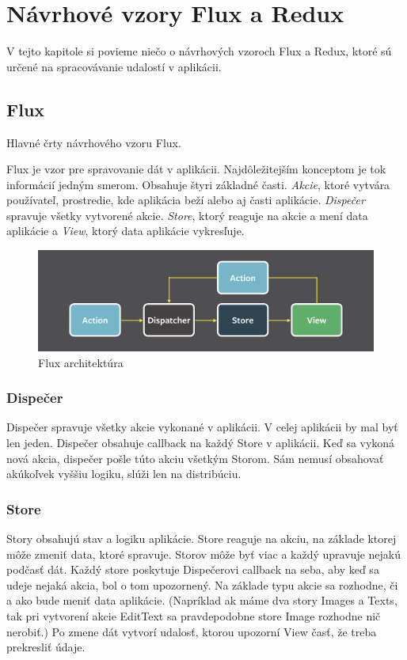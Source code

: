 \chapter{Návrhové vzory Flux a Redux}

\label{kap:vzory} %

V tejto kapitole si povieme niečo o návrhových vzoroch Flux a Redux, ktoré sú určené na spracovávanie udalostí v aplikácii.

\section{Flux}
Hlavné črty návrhového vzoru Flux. \cite[Overview]{Flux}

Flux je vzor pre spravovanie dát v aplikácii. Najdôležitejším konceptom je tok informácií jedným smerom. Obsahuje štyri základné časti. \emph{Akcie}, ktoré vytvára používateľ, prostredie, kde aplikácia beží alebo aj časti aplikácie. \emph{Dispečer} spravuje všetky vytvorené akcie. \emph{Store}, ktorý reaguje na akcie a mení data aplikácie a \emph{View}, ktorý data aplikácie vykresľuje.


\begin{figure}
  \centering
    \includegraphics[width=\textwidth]{./images/flux.png}
  \caption{Flux architektúra}
\end{figure}

\subsection{Dispečer}
Dispečer spravuje všetky akcie vykonané v aplikácii. V celej aplikácii by mal byť len jeden. Dispečer obsahuje callback %
na každý Store v aplikácii. Keď sa vykoná nová akcia, dispečer pošle túto akciu všetkým Storom. Sám nemusí obsahovať akúkoľvek vyššiu logiku, slúži len na distribúciu.

\subsection{Store}
Story obsahujú stav a logiku aplikácie. Store reaguje na akciu, na základe ktorej môže zmeniť data, ktoré spravuje. Storov môže byť viac a každý upravuje nejakú podčasť dát. Každý store poskytuje Dispečerovi callback na seba, aby keď sa udeje nejaká akcia, bol o tom upozornený. Na základe typu akcie sa rozhodne, či a ako bude meniť data aplikácie. (Napríklad ak máme dva story Images a Texts, tak pri vytvorení akcie EditText sa pravdepodobne store Image rozhodne nič nerobiť.) Po zmene dát vytvorí udalosť, ktorou upozorní View časť, že treba prekresliť údaje.

